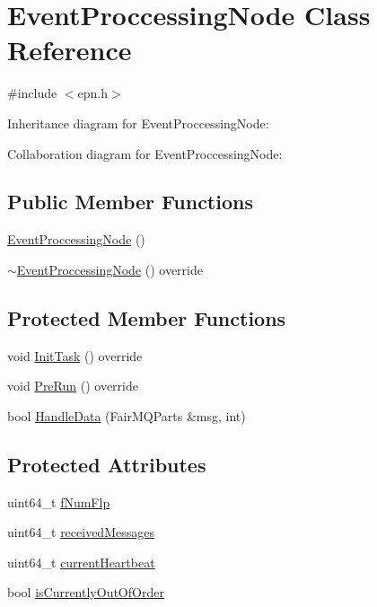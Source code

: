 \hypertarget{classEventProccessingNode}{}\section{Event\+Proccessing\+Node Class Reference}
\label{classEventProccessingNode}


{\ttfamily \#include $<$epn.\+h$>$}



Inheritance diagram for Event\+Proccessing\+Node\+:


Collaboration diagram for Event\+Proccessing\+Node\+:
\subsection*{Public Member Functions}
\begin{DoxyCompactItemize}
\item 
\hyperlink{classEventProccessingNode_a6312a3edf6a8baa7dee9f65c48090fa2}{Event\+Proccessing\+Node} ()
\item 
\hyperlink{classEventProccessingNode_aecdaccecfbcb665833a206b7aa8e86c5}{$\sim$\+Event\+Proccessing\+Node} () override
\end{DoxyCompactItemize}
\subsection*{Protected Member Functions}
\begin{DoxyCompactItemize}
\item 
void \hyperlink{classEventProccessingNode_aa8693560f7c9496254a06f2ac038fc92}{Init\+Task} () override
\item 
void \hyperlink{classEventProccessingNode_a093e1acf1b5be850fb0b8e420eec09ed}{Pre\+Run} () override
\item 
bool \hyperlink{classEventProccessingNode_aedf9495467d0596dda9e89d5a143cf16}{Handle\+Data} (Fair\+M\+Q\+Parts \&msg, int)
\end{DoxyCompactItemize}
\subsection*{Protected Attributes}
\begin{DoxyCompactItemize}
\item 
uint64\+\_\+t \hyperlink{classEventProccessingNode_a882c46266ea3498f6819558d4a0dc204}{f\+Num\+Flp}
\item 
uint64\+\_\+t \hyperlink{classEventProccessingNode_ab5b3c88ffab89a6c1fcc2bf01a7aad81}{received\+Messages}
\item 
uint64\+\_\+t \hyperlink{classEventProccessingNode_a098a24e60ecde3b62dbef77b1d04cce8}{current\+Heartbeat}
\item 
bool \hyperlink{classEventProccessingNode_a19ad46ab049d1956018fd8566fa451fe}{is\+Currently\+Out\+Of\+Order}
\end{DoxyCompactItemize}
